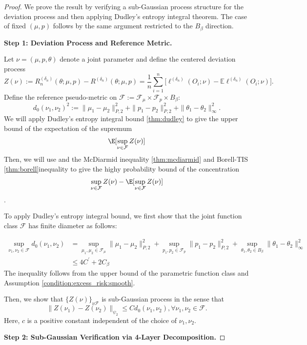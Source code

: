 \begin{proof}
We prove the result by verifying a sub-Gaussian process structure for the deviation process and then applying Dudley's entropy integral theorem. The case of fixed $(\mu,p)$ follows by the same argument restricted to the $B_\beta$ direction.

\noindent\textbf{Step 1: Deviation Process and Reference Metric.}

Let $\nu = (\mu,p,\theta)$ denote a joint parameter and define the centered deviation process
$$Z(\nu) := R_n^{(\delta_n)}(\theta;\mu,p) - R^{(\delta_n)}(\theta;\mu,p) = \frac{1}{n}\sum_{i=1}^n \bigl[\ell^{(\delta_n)}(O_i;\nu) - \mathbb{E}\ell^{(\delta_n)}(O_i;\nu)\bigr].$$
Define the reference pseudo-metric on $\mathcal{F}:=\mathcal{F}_\mu\times\mathcal{F}_p\times B_\beta$:
\begin{equation}\label{eq:d0_metric}
d_0(\nu_1,\nu_2)^2 := \|\mu_1-\mu_2\|_{P,2}^2 + \|p_1-p_2\|_{P,2}^2 + \|\theta_1-\theta_2\|_\infty^2.
\end{equation}
We will apply Dudley’s entropy integral bound \ref{thm:dudley} to give the upper bound of the  expectation of the supremum $$\E[\sup_{\nu\in\mathcal{F}}Z(\nu)]$$
Then, we will use and the McDiarmid inequality \ref{thm:mcdiarmid} and Borell-TIS \ref{thm:borell}inequality to give the highy probability bound of the concentration
$$\sup_{\nu\in\mathcal{F}}Z(\nu) - \E[\sup_{\nu\in\mathcal{F}}Z(\nu)]$$.

To apply Dudley’s entropy integral bound, we first show that the joint function class $\mathcal{F}$ has finite diameter as follows:

\begin{align}
\sup_{\nu_1,\nu_2\in\mathcal{F}}d_0(\nu_1,\nu_2)&= \sup_{\mu_1,\mu_2\in\mathcal{F}_\mu}\|\mu_1-\mu_2\|_{P,2}^2 + \sup_{p_1,p_2\in\mathcal{F}_p}\|p_1-p_2\|_{P,2}^2 + \sup_{\theta_1,\theta_2\in B_\beta}\|\theta_1-\theta_2\|_\infty^2\nonumber\\
&\leq 4C^\prime + 2C_\beta
\end{align}
The inequality follows from the upper bound of the parametric function class and Assumption \ref{condition:excess_risk:smooth}.

Then, we show that $\{Z(\nu)\}_{\nu\mathcal{F}}$ is sub-Gaussian process in the sense that
$$\|Z(\nu_1)-Z(\nu_2)\|_{\psi_2}\leq C d_0(\nu_1,\nu_2),\forall \nu_1,\nu_2\in\mathcal{F}.$$
Here, $c$ is a positive constant independent of the choice of $\nu_1,\nu_2$.


\noindent\textbf{Step 2: Sub-Gaussian Verification via 4-Layer Decomposition.}


\end{proof}
